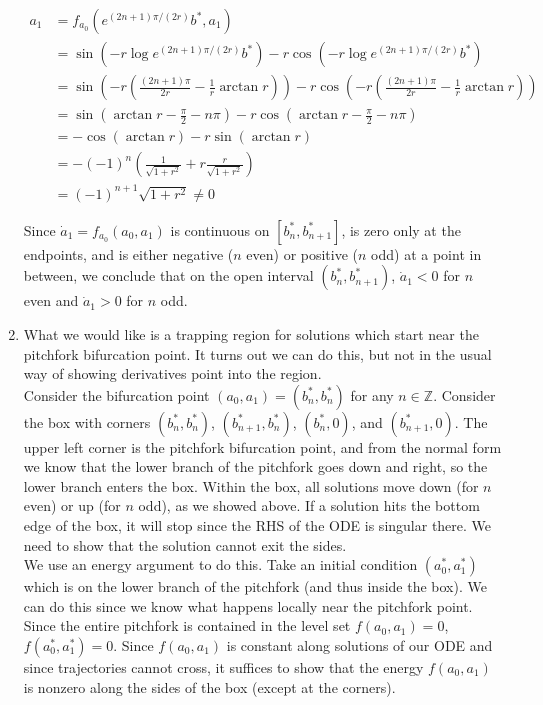 \documentclass[12pt]{article}
\def\Z{{\mathbb Z}}
\begin{document}
\begin{enumerate}
\begin{align*}
a_1 &= f_{a_0}(e^{(2n+1) \pi / (2r)}b^*, a_1) \\
&= \sin(-r \log e^{(2n+1) \pi / (2r)} b^* ) - r \cos( -r \log e^{(2n+1) \pi / (2r)} b^* ) \\
&= \sin\left(-r \left( \frac{(2n + 1)\pi}{2r} - \frac{1}{r} \arctan r \right) \right) - r \cos\left(-r \left( \frac{(2n + 1)\pi}{2r} - \frac{1}{r} \arctan r \right) \right) \\
&= \sin\left(\arctan r - \frac{\pi}{2} - n \pi \right) - r \cos\left(\arctan r - \frac{\pi}{2} - n \pi \right) \\
&= -\cos\left(\arctan r \right) - r \sin\left(\arctan r\right) \\
&= -(-1)^n \left( \frac{1}{\sqrt{1+r^2}} + r \frac{r}{\sqrt{1+r^2}}  \right) \\
&= (-1)^{n+1}\sqrt{1 + r^2} \neq 0
\end{align*}

Since $\dot a_1 = f_{a_0}(a_0, a_1)$ is continuous on $[b^*_n, b^*_{n+1}]$, is zero only at the endpoints, and is either negative ($n$ even) or positive ($n$ odd) at a point in between, we conclude that on the open interval $(b^*_n, b^*_{n+1})$, $\dot a_1 < 0$ for $n$ even and $\dot a_1 > 0$ for $n$ odd.\\

\item What we would like is a trapping region for solutions which start near the pitchfork bifurcation point. It turns out we can do this, but not in the usual way of showing derivatives point into the region.\\

Consider the bifurcation point $(a_0,a_1) = (b^*_n, b^*_n)$ for any $n \in \Z$. Consider the box with corners $(b^*_n, b^*_n)$, $(b^*_{n+1}, b^*_n)$, $(b^*_n, 0)$, and $(b^*_{n+1}, 0)$. The upper left corner is the pitchfork bifurcation point, and from the normal form we know that the lower branch of the pitchfork goes down and right, so the lower branch enters the box. Within the box, all solutions move down (for $n$ even) or up (for $n$ odd), as we showed above. If a solution hits the bottom edge of the box, it will stop since the RHS of the ODE is singular there. We need to show that the solution cannot exit the sides.\\

We use an energy argument to do this. Take an initial condition $(a_0^*, a_1^*)$ which is on the lower branch of the pitchfork (and thus inside the box). We can do this since we know what happens locally near the pitchfork point. Since the entire pitchfork is contained in the level set $f(a_0, a_1) = 0$, $f(a_0^*, a_1^*) = 0$. Since $f(a_0, a_1)$ is constant along solutions of our ODE and since trajectories cannot cross, it suffices to show that the energy $f(a_0, a_1)$ is nonzero along the sides of the box (except at the corners).\\


\end{enumerate}
\end{document}
